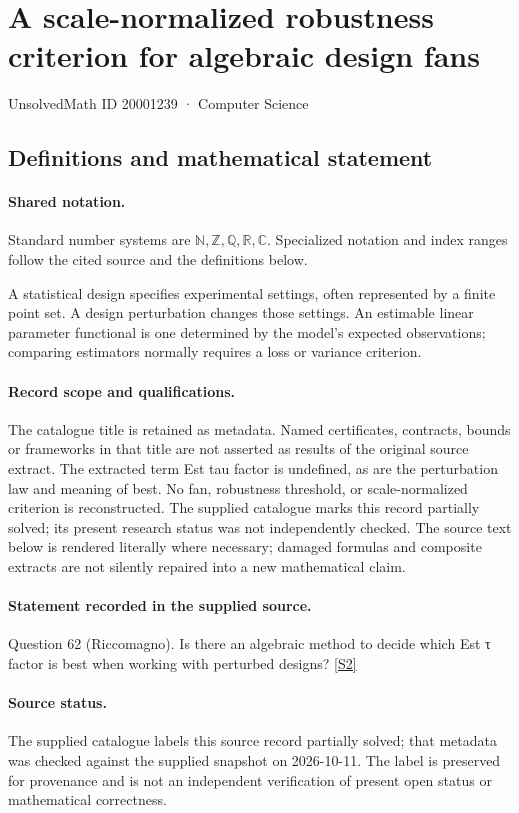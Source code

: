 \documentclass[11pt]{article}
\newcommand{\sref}[2]{\hyperlink{source:#1:#2}{[S#2]}}
\begin{document}
\setcounter{section}{20001238}
\section{A scale-normalized robustness criterion for algebraic design fans}\label{20001239}
{\small\sffamily UnsolvedMath ID 20001239 · Computer Science}
\subsection{Definitions and mathematical statement}

\paragraph{Shared notation.}Standard number systems are $\mathbb N,\mathbb Z,\mathbb Q,\mathbb R,\mathbb C$. Specialized notation and index ranges follow the cited source and the definitions below.


A statistical design specifies experimental settings, often represented by a finite point set. A design perturbation changes those settings. An estimable linear parameter functional is one determined by the model's expected observations; comparing estimators normally requires a loss or variance criterion.
\paragraph{Record scope and qualifications.}
The catalogue title is retained as metadata. Named certificates, contracts, bounds or frameworks in that title are not asserted as results of the original source extract.
The extracted term Est tau factor is undefined, as are the perturbation law and meaning of best. No fan, robustness threshold, or scale-normalized criterion is reconstructed. The supplied catalogue marks this record partially solved; its present research status was not independently checked.
The source text below is rendered literally where necessary; damaged formulas and composite extracts are not silently repaired into a new mathematical claim.
\paragraph{Statement recorded in the supplied source.}
Question 62 (Riccomagno). Is there an algebraic method to decide which Est τ factor is best when working with perturbed designs? \sref{20001239}{2}
\paragraph{Source status.}
The supplied catalogue labels this source record partially solved; that metadata was checked against the supplied snapshot on 2026-10-11. The label is preserved for provenance and is not an independent verification of present open status or mathematical correctness.
\end{document}
